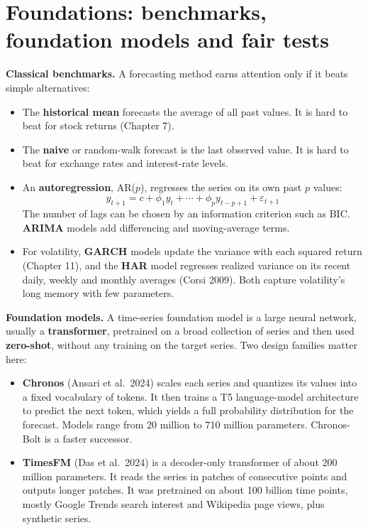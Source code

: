 \section{Foundations: benchmarks, foundation models and fair tests}
\label{sec:22-foundations}

\textbf{Classical benchmarks.} A forecasting method earns attention only if it beats simple alternatives:

\begin{itemize}
  \item The \textbf{historical mean} forecasts the average of all past values. It is hard to beat for stock returns (Chapter 7).
  \item The \textbf{naive} or random-walk forecast is the last observed value. It is hard to beat for exchange rates and interest-rate levels.
  \item An \textbf{autoregression}, AR($p$), regresses the series on its own past $p$ values:
  \begin{equation}
    y_{t+1} = c + \phi_1 y_t + \cdots + \phi_p y_{t-p+1} + \varepsilon_{t+1}
    \label{eq:22-ar}
  \end{equation}
  The number of lags can be chosen by an information criterion such as BIC. \textbf{ARIMA} models add differencing and moving-average terms.
  \item For volatility, \textbf{GARCH} models update the variance with each squared return (Chapter 11), and the \textbf{HAR} model regresses realized variance on its recent daily, weekly and monthly averages (Corsi 2009). Both capture volatility's long memory with few parameters.
\end{itemize}

\textbf{Foundation models.} A time-series foundation model is a large neural network, usually a \textbf{transformer}, pretrained on a broad collection of series and then used \textbf{zero-shot}, without any training on the target series. Two design families matter here:

\begin{itemize}
  \item \textbf{Chronos} (Ansari et al.\ 2024) scales each series and quantizes its values into a fixed vocabulary of tokens. It then trains a T5 language-model architecture to predict the next token, which yields a full probability distribution for the forecast. Models range from 20 million to 710 million parameters. Chronos-Bolt is a faster successor.
  \item \textbf{TimesFM} (Das et al.\ 2024) is a decoder-only transformer of about 200 million parameters. It reads the series in patches of consecutive points and outputs longer patches. It was pretrained on about 100 billion time points, mostly Google Trends search interest and Wikipedia page views, plus synthetic series.
\end{itemize}

